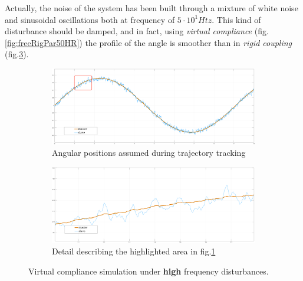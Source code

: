 \newpage

Actually, the noise of the system has been built through a mixture of white
noise and sinusoidal oscillations both at frequency of $5\cdot 10^{1} Htz$.
\newline
This kind of disturbance should be damped, and in fact, using \textsl{virtual
  compliance} (fig.\ref{fig:freeRigPar50HR}) the profile of the angle is smoother
than in \textsl{rigid coupling} (fig.\ref{fig:freeSetPar50HR}).

\bigskip


\begin{figure}[h]
	\begin{subfigure}[h!]{1\linewidth}
		\centering
		\includegraphics[width=\textwidth, height=0.48\textwidth]{Images/set20freeTot50HtznoiseRect}
		\caption{Angular positions assumed during trajectory tracking}
		\label{fig:freeSetTot50HR}
	\end{subfigure}	
  \newline
	\begin{subfigure}[h!]{1\linewidth}
		\centering
		\includegraphics[width=\textwidth, height=0.48\textwidth]{Images/set20freePart50Htznoise}
		\caption{Detail describing the highlighted area in fig.\ref{fig:freeSetTot50HR}}
		\label{fig:freeSetPar50HR}
	\end{subfigure}	
  \caption{ Virtual compliance simulation under \textbf{high} frequency disturbances. }
\end{figure}






